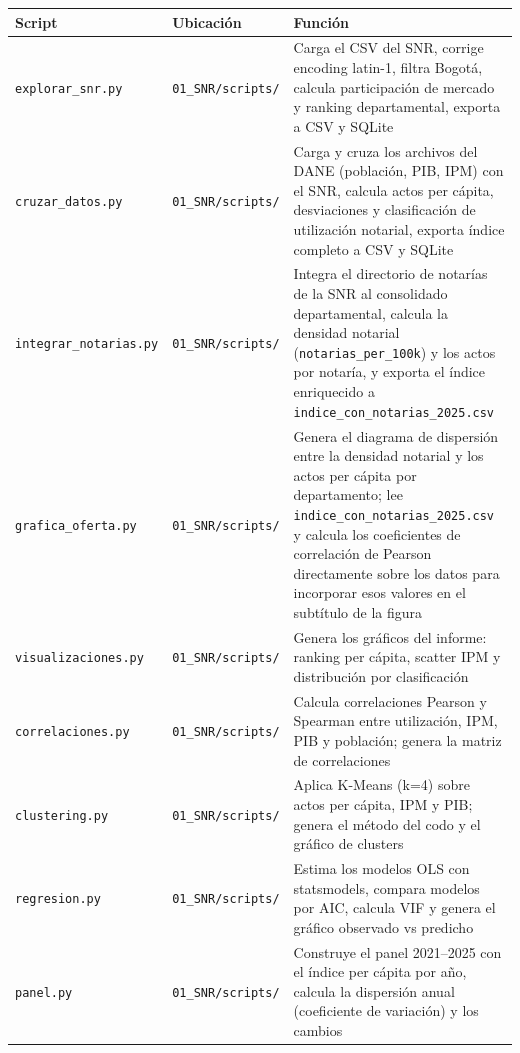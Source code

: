 \documentclass{article}
\begin{document}
\begin{table}[H]
\centering
\begin{tabular}{llp{6cm}}
\toprule
\textbf{Script} & \textbf{Ubicación} & 
\textbf{Función} \\
\midrule
\texttt{explorar\_snr.py} & \texttt{01\_SNR/scripts/} & Carga el CSV del SNR, corrige encoding 
latin-1, filtra Bogotá, calcula participación 
de mercado y ranking departamental, exporta 
a CSV y SQLite \\
\addlinespace
\texttt{cruzar\_datos.py} & \texttt{01\_SNR/scripts/} & Carga y cruza los archivos del DANE 
(población, PIB, IPM) con el SNR, calcula 
actos per cápita, desviaciones y clasificación 
de utilización notarial, exporta índice completo 
a CSV y SQLite \\
\addlinespace
\texttt{integrar\_notarias.py} & \texttt{01\_SNR/scripts/} & Integra el directorio de notarías de la SNR
al consolidado departamental, calcula la densidad
notarial (\texttt{notarias\_per\_100k}) y los
actos por notaría, y exporta el índice enriquecido
a \texttt{indice\_con\_notarias\_2025.csv} \\
\addlinespace
\texttt{grafica\_oferta.py} & \texttt{01\_SNR/scripts/} & Genera el diagrama de dispersión entre la
densidad notarial y los actos per cápita por
departamento; lee \texttt{indice\_con\_notarias\_2025.csv}
y calcula los coeficientes de correlación de Pearson
directamente sobre los datos para incorporar esos
valores en el subtítulo de la figura \\
\addlinespace
\texttt{visualizaciones.py} & \texttt{01\_SNR/scripts/} & Genera 
los gráficos del informe: ranking per cápita, scatter IPM 
y distribución por clasificación \\
\addlinespace
\texttt{correlaciones.py} & \texttt{01\_SNR/scripts/} & Calcula 
correlaciones Pearson y Spearman entre utilización, IPM, PIB 
y población; genera la matriz de correlaciones \\
\addlinespace
\texttt{clustering.py} & \texttt{01\_SNR/scripts/} & Aplica 
K-Means (k=4) sobre actos per cápita, IPM y PIB; genera el 
método del codo y el gráfico de clusters \\
\addlinespace
\texttt{regresion.py} & \texttt{01\_SNR/scripts/} & Estima 
los modelos OLS con statsmodels, compara modelos por AIC, 
calcula VIF y genera el gráfico observado vs predicho \\
\addlinespace
\texttt{panel.py} & \texttt{01\_SNR/scripts/} & Construye 
el panel 2021--2025 con el índice per cápita por año, calcula 
la dispersión anual (coeficiente de variación) y los cambios 

\end{tabular}
\end{table}
\end{document}
